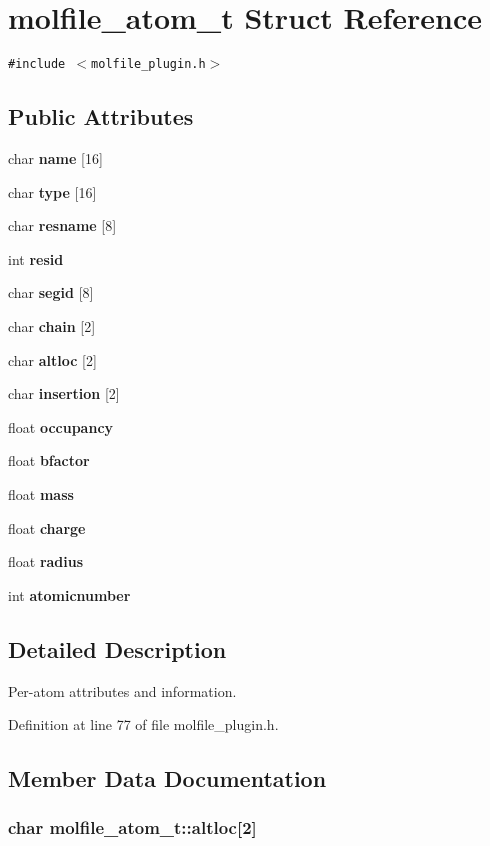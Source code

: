 \section{molfile\_\-atom\_\-t  Struct Reference}
\label{structmolfile__atom__t}
{\tt \#include $<$molfile\_\-plugin.h$>$}

\subsection*{Public Attributes}
\begin{CompactItemize}
\item 
char {\bf name} [16]
\item 
char {\bf type} [16]
\item 
char {\bf resname} [8]
\item 
int {\bf resid}
\item 
char {\bf segid} [8]
\item 
char {\bf chain} [2]
\item 
char {\bf altloc} [2]
\item 
char {\bf insertion} [2]
\item 
float {\bf occupancy}
\item 
float {\bf bfactor}
\item 
float {\bf mass}
\item 
float {\bf charge}
\item 
float {\bf radius}
\item 
int {\bf atomicnumber}
\end{CompactItemize}


\subsection{Detailed Description}
Per-atom attributes and information. 



Definition at line 77 of file molfile\_\-plugin.h.

\subsection{Member Data Documentation}
\subsubsection{\setlength{\rightskip}{0pt plus 5cm}char molfile\_\-atom\_\-t::altloc[2]}\label{structmolfile__atom__t_m6}



